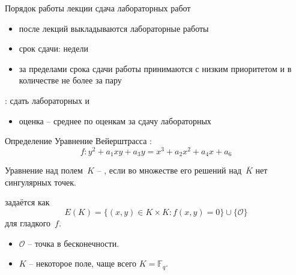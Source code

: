 \documentclass{beamer}
\begin{document}
\begin{frame}{Порядок работы}
	 лекции \structure{+} сдача лабораторных работ
\vspace{0.5em}
\begin{itemize}
	\item после лекций выкладываются лабораторные работы
	\item срок сдачи:  недели
	\item за пределами срока сдачи работы принимаются с низким приоритетом и в количестве не более  за пару
\end{itemize}
\vspace{0.5em}
: сдать  лабораторных и 
\begin{itemize}
	\item оценка -- среднее по оценкам за сдачу лабораторных
\end{itemize}
\end{frame}

\begin{frame}{Определение}
	Уравнение Вейерштрасса :
	\begin{equation}\label{eq:weierstrassequation}
		f: y^2+a_1xy + a_3y = x^3 + a_2x^2 + a_4x + a_6
	\end{equation}

	Уравнение над полем~$K$ -- , если во множестве его решений над~$\overline{K}$ нет сингулярных точек.
	\vspace{1em}
	
	 задаётся как \[E(K) = \{ (x,y) \in K \times K: f(x,y)=0 \} \cup \{\mathcal{O}\}
	\]
	для гладкого~$f$.
	\begin{itemize}
		\item $\mathcal{O}$ -- точка в бесконечности.
		\item $K$ -- некоторое поле, чаще всего $K = \mathbb{F}_q$.
	\end{itemize}
\end{frame}
\end{document}
